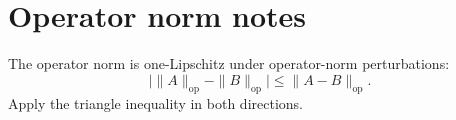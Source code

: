 \documentclass{article}
\begin{document}
\section{Operator norm notes}
The operator norm is one-Lipschitz under operator-norm perturbations:
\[\bigl|\|A\|_{\mathrm{op}}-\|B\|_{\mathrm{op}}\bigr|
\leq\|A-B\|_{\mathrm{op}}.\]
Apply the triangle inequality in both directions.
\end{document}
